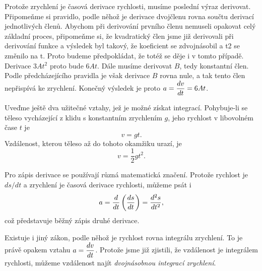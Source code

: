     Protože zrychlení je časová derivace rychlosti, musíme poslední výraz derivovat. Připomeňme si 
    pravidlo, podle něhož je derivace dvojčlenu rovna součtu derivací jednotlivých členů. Abychom 
    při derivování prvního členu nemuseli opakovat celý základní proces, připomeňme si, že 
    kvadratický člen jsme již derivovali při derivování funkce a výsledek byl takový, že koeficient 
    se zdvojnásobil a t2 se změnilo na t. Proto budeme předpokládat, že totéž se děje i v tomto 
    případě. Derivace \(3At^2\) proto bude \(6At\). Dále musíme derivovat \(B\), tedy konstantní 
    člen. Podle předcházejícího pravidla je však derivace \(B\) rovna nule, a tak tento člen 
    nepřispívá ke zrychlení. Konečný výsledek je proto \(a=\dfrac{d v}{d t}= 6At\).
    
    Uveďme ještě dva užitečné vztahy, jež je možné získat integrací. Pohybuje-li se těleso 
    vycházející z klidu s konstantním zrychlením \(g\), jeho rychlost v libovolném čase \(t\) je
    \begin{equation}\label{FYZ:eq103}
      v = gt.
    \end{equation}
    Vzdálenost, kterou těleso až do tohoto okamžiku urazí, je
    \begin{equation}\label{FYZ:eq104}
      v = \frac{1}{2}gt^2.
    \end{equation}
    
    Pro zápis derivace se používají různá matematická značení. Protože rychlost je \(ds/dt\) a 
    zrychlení je časová derivace rychlosti, můžeme psát i
    \begin{equation}\label{FYZ:eq105}
      a = \dfrac{d  }{d t}\left(\dfrac{d s}{d t}\right) = \dfrac{d^2 s}{d t^2},
    \end{equation}
    což představuje běžný zápis druhé derivace.
    
    Existuje i jiný zákon, podle něhož je rychlost rovna integrálu zrychlení. To je právě opakem 
    vztahu \(a = \dfrac{d v}{d t}\). Protože jsme již zjistili, že vzdálenost je integrálem rychlosti, 
    můžeme vzdálenost najít \emph{dvojnásobnou integrací zrychlení}.
    
